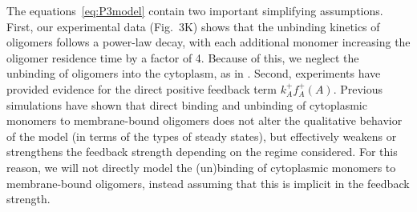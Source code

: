 \documentclass[11pt]{article}
\newcommand{\6}[1]{#1_{\text{6}}}
\newcommand{\3}[1]{#1_{\text{3}}}
\begin{document}
The equations\ \eqref{eq:P3model} contain two important simplifying assumptions. First, our experimental data (Fig.\ 3K) shows that the unbinding kinetics of oligomers follows a power-law decay, with each additional monomer increasing the oligomer residence time by a factor of 4. Because of this, we neglect the unbinding of oligomers into the cytoplasm, as in \cite{lang2022oligomerization}. Second, experiments have provided evidence for the direct positive feedback term $k_A^+ f_A^+(A)$. Previous simulations \cite{lang2022oligomerization} have shown that direct binding and unbinding of cytoplasmic monomers to membrane-bound oligomers does not alter the qualitative behavior of the model (in terms of the types of steady states), but effectively weakens or strengthens the feedback strength depending on the regime considered. For this reason, we will not directly model the (un)binding of cytoplasmic monomers to membrane-bound oligomers, instead assuming that this is implicit in the feedback strength.
\end{document}
